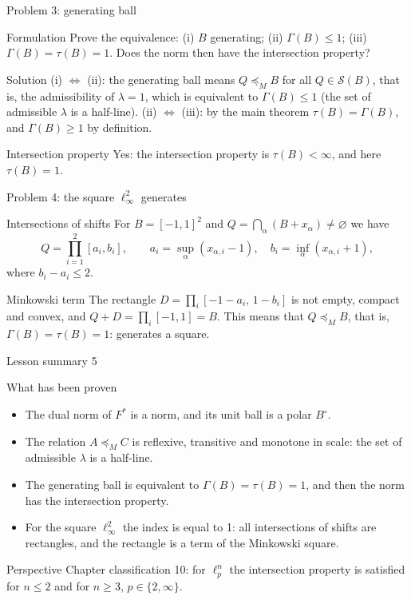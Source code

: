 \documentclass[aspectratio=169,11pt]{beamer}
\begin{document}
\begin{frame}{Problem \textup{3}: generating ball}
\begin{block}{Formulation}
Prove the equivalence\textup{:} \textup{(i)} $B$ generating\textup{;} \textup{(ii)} $\Gamma(B)\le1$\textup{;} \textup{(iii)} $\Gamma(B)=\tau(B)=1$. Does the norm then have the intersection property?
\end{block}
\begin{block}{Solution}
\textup{(i)} $\Leftrightarrow$ \textup{(ii)}\textup{:} the generating ball means $Q\preceq_M B$ for all $Q\in\mathcal S(B)$, that is, the admissibility of $\lambda=1$, which is equivalent to $\Gamma(B)\le1$ (the set of admissible $\lambda$ is a half-line).
\textup{(ii)} $\Leftrightarrow$ \textup{(iii)}\textup{:} by the main theorem $\tau(B)=\Gamma(B)$, and $\Gamma(B)\ge1$ by definition.
\end{block}
\begin{block}{Intersection property}
Yes\textup{:} the intersection property is $\tau(B)<\infty$, and here $\tau(B)=1$.
\end{block}
\end{frame}

\begin{frame}{Problem \textup{4}: the square $\ell_\infty^2$ generates}
\begin{block}{Intersections of shifts}
For $B=[-1,1]^2$ and $Q=\bigcap_\alpha(B+x_\alpha)\ne\varnothing$ we have
\[
Q=\prod_{i=1}^2[a_i,b_i],\qquad a_i=\sup_\alpha(x_{\alpha,i}-1),\quad b_i=\inf_\alpha(x_{\alpha,i}+1),
\]
where $b_i-a_i\le2$.
\end{block}
\begin{block}{Minkowski term}
The rectangle $D=\prod_i[-1-a_i,\,1-b_i]$ is not empty, compact and convex, and $Q+D=\prod_i[-1,1]=B$. This means that $Q\preceq_M B$, that is, $\Gamma(B)=\tau(B)=1$\textup{:} generates a square.
\end{block}
\end{frame}

\begin{frame}{Lesson summary \textup{5}}
\begin{block}{What has been proven}
\begin{itemize}
\item The dual norm of $F^*$ is a norm, and its unit ball is a polar $B^\circ$.
\item The relation $A\preceq_M C$ is reflexive, transitive and monotone in scale\textup{:} the set of admissible $\lambda$ is a half-line.
\item The generating ball is equivalent to $\Gamma(B)=\tau(B)=1$, and then the norm has the intersection property.
\item For the square $\ell_\infty^2$ the index is equal to \textup{1}\textup{:} all intersections of shifts are rectangles, and the rectangle is a term of the Minkowski square.
\end{itemize}
\end{block}
\begin{block}{Perspective}
Chapter classification \textup{10}\textup{:} for $\ell_p^n$ the intersection property is satisfied for $n\le2$ and for $n\ge3$, $p\in\{2,\infty\}$.
\end{block}
\end{frame}
\end{document}
